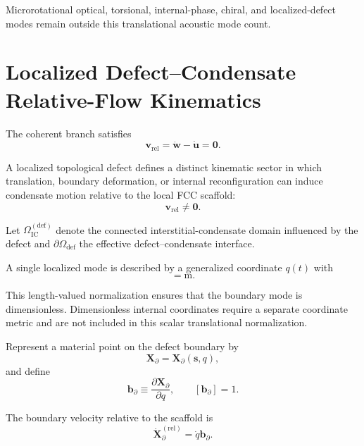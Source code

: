 Microrotational optical, torsional, internal-phase, chiral, and localized-defect modes remain outside this translational acoustic mode count.


\section{Localized Defect--Condensate Relative-Flow Kinematics}
\label{sec:AP_localized_kinematics}

The coherent branch satisfies
\begin{equation}
    \mathbf{v}_{\mathrm{rel}}
    =
    \dot{\mathbf{w}}
    -
    \dot{\mathbf{u}}
    =
    \mathbf{0}.
\end{equation}

A localized topological defect defines a distinct kinematic sector in which translation, boundary deformation, or internal reconfiguration can induce condensate motion relative to the local FCC scaffold:
\begin{equation}
    \mathbf{v}_{\mathrm{rel}}
    \neq
    \mathbf{0}.
\end{equation}

Let $\Omega_{\mathrm{IC}}^{(\mathrm{def})}$ denote the connected interstitial-condensate domain influenced by the defect and $\partial\Omega_{\mathrm{def}}$ the effective defect--condensate interface.

A single localized mode is described by a generalized coordinate $q(t)$ with
\begin{equation}
    [q]
    =
    \mathrm{m}.
\end{equation}

This length-valued normalization ensures that the boundary mode is dimensionless. Dimensionless internal coordinates require a separate coordinate metric and are not included in this scalar translational normalization.

Represent a material point on the defect boundary by
\begin{equation}
    \mathbf{X}_{\partial}
    =
    \mathbf{X}_{\partial}(\boldsymbol{s},q),
\end{equation}
and define
\begin{equation}
    \mathbf{b}_{\partial}
    \equiv
    \frac{\partial\mathbf{X}_{\partial}}{\partial q},
    \qquad
    [\mathbf{b}_{\partial}]
    =
    1.
\end{equation}

The boundary velocity relative to the scaffold is
\begin{equation}
    \dot{\mathbf{X}}_{\partial}^{(\mathrm{rel})}
    =
    \dot{q}
    \mathbf{b}_{\partial}.
\end{equation}

